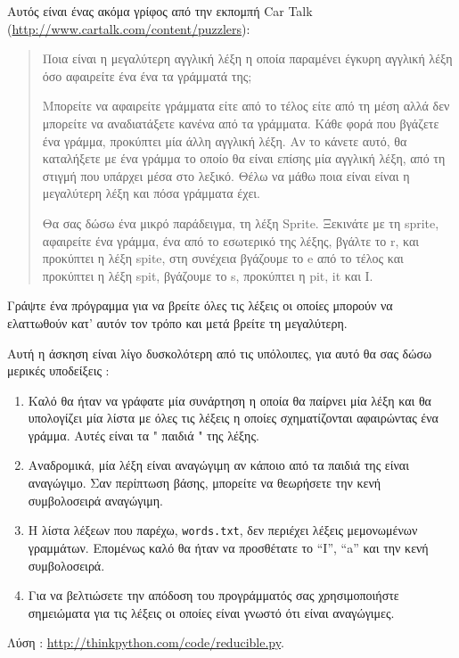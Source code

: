 \documentclass[10pt]{book}
\begin{document}
 
\begin{exercise} 

Αυτός είναι ένας ακόμα γρίφος από την εκπομπή  Car Talk (\url{http://www.cartalk.com/content/puzzlers}):

\begin{quote}
 Ποια είναι η μεγαλύτερη αγγλική λέξη η οποία παραμένει έγκυρη αγγλική λέξη όσο αφαιρείτε ένα ένα τα γράμματά της; 

Μπορείτε να αφαιρείτε γράμματα είτε από το τέλος είτε από τη μέση αλλά δεν μπορείτε να αναδιατάξετε κανένα από τα γράμματα. Κάθε φορά που βγάζετε ένα γράμμα, προκύπτει μία άλλη αγγλική λέξη. Αν το κάνετε αυτό, θα καταλήξετε με ένα γράμμα το οποίο θα είναι επίσης μία αγγλική λέξη, από τη στιγμή που υπάρχει μέσα στο λεξικό. Θέλω να μάθω ποια είναι είναι η μεγαλύτερη λέξη και πόσα γράμματα έχει.

Θα σας δώσω ένα μικρό παράδειγμα, τη λέξη  Sprite.  Ξεκινάτε με τη  sprite,  αφαιρείτε ένα γράμμα, ένα από το εσωτερικό της λέξης, βγάλτε το  r,  και προκύπτει η λέξη  spite,  στη συνέχεια βγάζουμε το  e  από το τέλος και προκύπτει η λέξη  spit,  βγάζουμε το  s,  προκύπτει η  pit, it  και  I.
\end{quote}

 Γράψτε ένα πρόγραμμα για να βρείτε όλες τις λέξεις οι οποίες μπορούν να ελαττωθούν κατ' αυτόν τον τρόπο και μετά βρείτε τη μεγαλύτερη.

Αυτή η άσκηση είναι λίγο δυσκολότερη από τις υπόλοιπες, για αυτό θα σας δώσω μερικές υποδείξεις :

\begin{enumerate}

\item  Καλό θα ήταν να γράφατε μία συνάρτηση η οποία θα παίρνει μία λέξη και θα υπολογίζει μία λίστα με όλες τις λέξεις η οποίες σχηματίζονται αφαιρώντας ένα γράμμα. Αυτές είναι τα  " παιδιά "  της λέξης. 

\item  Αναδρομικά, μία λέξη είναι αναγώγιμη αν κάποιο από τα παιδιά της είναι αναγώγιμο. Σαν περίπτωση βάσης, μπορείτε να θεωρήσετε την κενή συμβολοσειρά αναγώγιμη. 

\item  Η λίστα λέξεων που παρέχω,  {\tt words.txt},  δεν περιέχει λέξεις μεμονωμένων γραμμάτων. Επομένως καλό θα ήταν να προσθέτατε το  ``I'', ``a''  και την κενή συμβολοσειρά. 

\item  Για να βελτιώσετε την απόδοση του προγράμματός σας χρησιμοποιήστε σημειώματα για τις λέξεις οι οποίες είναι γνωστό ότι είναι αναγώγιμες. 
\end{enumerate}

 Λύση : \url{http://thinkpython.com/code/reducible.py}.

\end{exercise}
\end{document}
